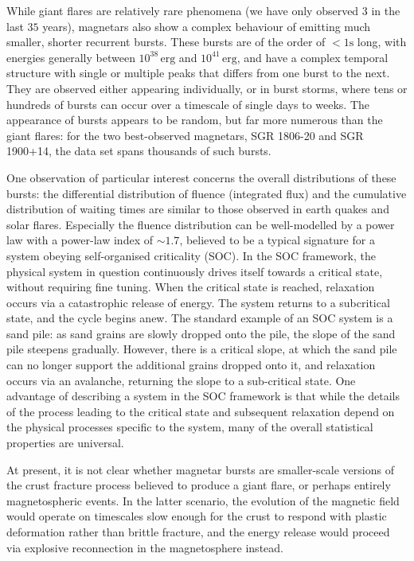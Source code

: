 \documentclass[12pt]{emulateapj}
\begin{document}
While giant flares are relatively rare phenomena (we have only observed $3$ in the last $35$ years), magnetars also show a complex
behaviour of emitting much smaller, shorter recurrent bursts. These bursts are of the order of $<1\mathrm{s}$ long, with energies
generally between $10^{38}\,\mathrm{erg}$ and $10^{41}\,\mathrm{erg}$, and have a complex temporal structure with single or
multiple peaks that differs from one burst to the next. They are observed either appearing individually, or in burst 
storms, where tens or hundreds of bursts can occur over a timescale of single days to weeks. The appearance of bursts appears to be
random, but far more numerous than the giant flares: for the two best-observed magnetars, SGR 1806-20 and SGR 1900+14, the
data set spans thousands of such bursts. 

One observation of particular interest concerns the overall distributions of these bursts: the differential distribution of fluence (integrated flux) and 
the cumulative distribution of waiting times are similar to those observed in earth quakes and solar flares. Especially the fluence distribution
can be well-modelled by a power law with a power-law index of $\sim 1.7$, believed to be a typical signature for a system obeying 
self-organised criticality (SOC). In the SOC framework, the physical system in question continuously drives itself towards a critical state,
without requiring fine tuning. When the critical state is reached, relaxation occurs via a catastrophic release of energy. The system returns
to a subcritical state, and the cycle begins anew. The standard example of an SOC system is a sand pile: as sand grains are slowly dropped onto
the pile, the slope of the sand pile steepens gradually. However, there is a critical slope, at which the sand pile can no longer support the 
additional grains dropped onto it, and relaxation occurs via an avalanche, returning the slope to a sub-critical state. 
One advantage of describing a system in the SOC framework is that while the details of the process leading to the critical state and subsequent
relaxation depend on the physical processes specific to the system, many of the overall statistical properties are universal.


At present, it is not clear whether magnetar bursts are smaller-scale versions of the crust fracture process believed to produce a giant flare,
or perhaps entirely magnetospheric events. In the latter scenario, the evolution of the magnetic field would operate on timescales
slow enough for the crust to respond with plastic deformation rather than brittle fracture, and the energy release would proceed via
explosive reconnection in the magnetosphere instead.
\end{document}
